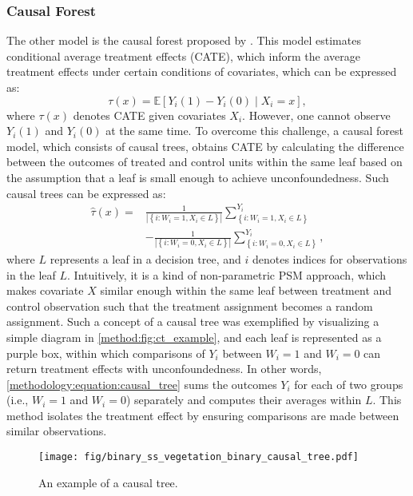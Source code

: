 \documentclass[preprint,12pt, authoryear]{elsarticle}
\begin{document}
\subsubsection{Causal Forest}
The other model is the causal forest proposed by \citet{athey_estimating_2019}. 
This model estimates conditional average treatment effects (CATE), which inform the average treatment effects under certain conditions of covariates, which can be expressed as:
\begin{equation}
\tau(x)=\mathbb{E}\left[Y_i(1)-Y_i(0) \mid X_i=x\right],
\end{equation}
where $\tau(x)$ denotes CATE given covariates $X_i$. 
However, one cannot observe $Y_i(1)$ and $Y_i(0)$ at the same time.
To overcome this challenge, a causal forest model, which consists of causal trees, obtains CATE by calculating the difference between the outcomes of treated and control units within the same leaf based on the assumption that a leaf is small enough to achieve unconfoundedness.
Such causal trees can be expressed as:
\begin{equation}
\begin{aligned}
\hat{\tau}(x)= & \frac{1}{\left|\left\{i: W_i=1, X_i \in L\right\}\right|} \sum_{\left\{i: W_i=1, X_i \in L\right\}}^{Y_i} \\
& -\frac{1}{\left|\left\{i: W_i=0, X_i \in L\right\}\right|} \sum_{\left\{i: W_i=0, X_i \in L\right\}}^{Y_i},
\end{aligned}
\label{methodology:equation:causal_tree}
\end{equation}
where $L$ represents a leaf in a decision tree, and $i$ denotes indices for observations in the leaf $L$. 
Intuitively, it is a kind of non-parametric PSM approach, which makes covariate $X$ similar enough within the same leaf between treatment and control observation such that the treatment assignment becomes a random assignment. 
Such a concept of a causal tree was exemplified by visualizing a simple diagram in \autoref{method:fig:ct_example}, and each leaf is represented as a purple box, within which comparisons of $Y_i$ between $W_i = 1$ and $W_i = 0$ can return treatment effects with unconfoundedness. 
In other words, \autoref{methodology:equation:causal_tree} sums the outcomes $Y_i$ for each of two groups (i.e., $W_i = 1$ and $W_i = 0$) separately and computes their averages within $L$. This method isolates the treatment effect by ensuring comparisons are made between similar observations.

\begin{figure}[!htp]
    \centering
    \texttt{[image: fig/binary\_ss\_vegetation\_binary\_causal\_tree.pdf]} 
    \caption{An example of a causal tree.}
    \label{method:fig:ct_example}
\end{figure}
\end{document}
